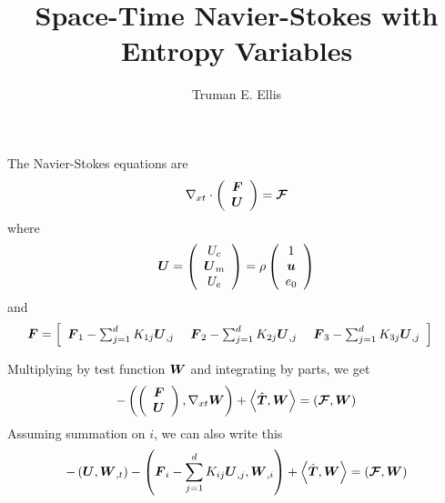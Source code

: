 \documentclass{article}
\title{Space-Time Navier-Stokes with Entropy Variables}
\author{Truman E. Ellis}
\begin{document}
\maketitle

The Navier-Stokes equations are
\begin{equation}
\Divxt\vecttwo{\bfF}{\bfU}=\bs{\mathcal{F}}
\end{equation}
where
\begin{equation*}
\bfU=\vectthree{U_c}{\bfU_m}{U_e}=\rho\vectthree{1}{\bfu}{e_0}
\end{equation*}
and
\begin{align*}
\bfF
&=\arrthreeone
{\bfF_1-\sum_{j=1}^dK_{1j}\bfU_{,j}}
{\bfF_2-\sum_{j=1}^dK_{2j}\bfU_{,j}}
{\bfF_3-\sum_{j=1}^dK_{3j}\bfU_{,j}}
\end{align*}

Multiplying by test function $\bfW$ and integrating by parts, we get
\begin{equation}
-\LRp{\vecttwo{\bfF}{\bfU},\Gradxt \bfW}+\LRa{\hat{\bfT}, \bfW}=\LRp{\bs{\mathcal{F}},\bfW}
\end{equation}
Assuming summation on $i$, we can also write this
\begin{equation}
-\LRp{\bfU,\bfW_{,t}}-\LRp{\bfF_i-\sum_{j=1}^dK_{ij}\bfU_{,j},\bfW_{,i}}+\LRa{\hat{\bfT}, \bfW}=\LRp{\bs{\mathcal{F}},\bfW}
\end{equation}
\end{document}
